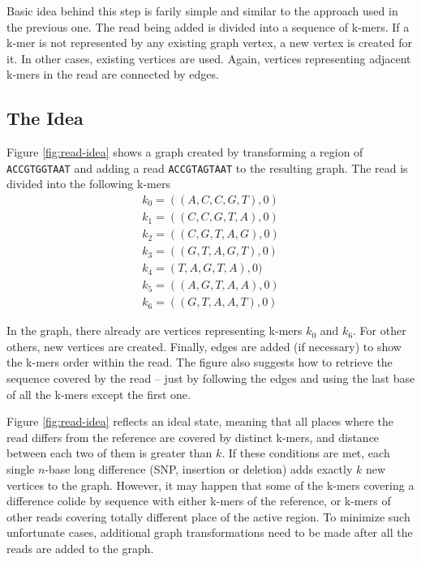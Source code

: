 Basic idea behind this step is farily simple and similar to the approach used in the previous one. The read being added is divided into a sequence of k-mers. If a k-mer is not represented by any existing graph vertex, a new vertex is created for it. In other cases, existing vertices are used. Again, vertices representing adjacent k-mers in the read are connected by edges. 

\subsection{The Idea}
\label{subsec:idea}

Figure \ref{fig:read-idea} shows a graph created by transforming a region of \texttt{ACCGTGGTAAT} and adding a read \texttt{ACCGTAGTAAT} to the resulting graph. The read is divided into the following k-mers
\begin{gather}
k_0 = ((A, C, C, G, T), 0) \\
k_1 = ((C, C, G, T, A), 0) \\
k_2 = ((C, G, T, A, G), 0) \\
k_3 = ((G, T, A, G, T), 0) \\
k_4 = (T, A, G, T, A), 0) \\
 k_5 = ((A, G, T, A, A), 0) \\
k_6 = ((G, T, A, A, T), 0)
\end{gather}

In the graph, there already are vertices representing k-mers $k_0$ and $k_6$. For other others, new vertices are created. Finally, edges are added (if necessary) to show the k-mers order within the read. The figure also suggests how to retrieve the sequence covered by the read – just by following the edges and using the last base of all the k-mers except the first one. 

Figure \ref{fig:read-idea} reflects an ideal state, meaning that all places where the read differs from the reference are covered by distinct k-mers, and distance between each two of them is greater than $k$. If these conditions are met, each single $n$-base long difference (SNP, insertion or deletion) adds exactly $k$ new vertices to the graph. However, it may happen that some of the k-mers covering a difference colide by sequence with either k-mers of the reference, or k-mers of other reads covering totally different place of the active region. To minimize such unfortunate cases, additional graph transformations need to be made after all the reads are added to the graph.

